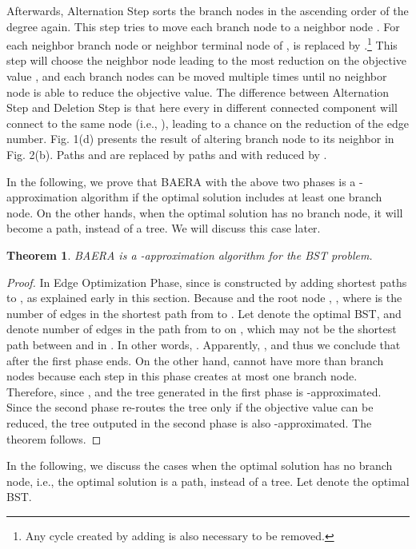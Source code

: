 \documentclass[conference]{IEEEtran}
\newtheorem{theorem}{Theorem}
\begin{document}
Afterwards, Alternation Step sorts the branch nodes in the ascending order
of the degree again. This step tries to move each branch node  to a
neighbor node . For each neighbor branch node or neighbor terminal
node  of ,  is replaced by .\footnote{Any cycle created by adding  is also necessary to be removed.}
This step will choose the neighbor node  leading to the most
reduction on the objective value , and each branch nodes can be
moved multiple times until no neighbor node is able to reduce the objective
value. The difference between Alternation Step and Deletion Step is that
here every  in different connected component will connect to the same
node (i.e., ), leading to a chance on the reduction of the edge
number. {Fig. 1(d) presents the result of altering branch node } to its
neighbor  in Fig. 2(b). Paths  and  are replaced by
paths  and  with  reduced by .

In the following, we prove that BAERA with the above two phases is a -approximation algorithm if the optimal solution includes at least one
branch node. On the other hands, when the optimal solution has no branch
node, it will become a path, instead of a tree.  We will discuss this case later.


\begin{theorem}
BAERA is a -approximation algorithm for the BST problem.
\label{thm:k_ratio}
\end{theorem}

\begin{proof}
In Edge Optimization Phase, since  is constructed by adding shortest
paths to ,  as explained early in this
section. Because 
and the root node , , where  is
the number of edges in the shortest path from  to . Let 
denote the optimal BST, and  denote number of edges in the
path from  to  on , which may not be the shortest path
between  and  in . In other words, .
Apparently, , and thus we conclude that  after the first phase ends. On the
other hand,  cannot have more than  branch nodes because each step in
this phase creates at most one branch node. Therefore,  since , and the tree  generated in the
first phase is -approximated. Since the second phase re-routes the tree
only if the objective value  can be reduced, the tree 
outputed in the second phase is also -approximated. The theorem follows.
\end{proof}



In the following, we discuss the cases when  the optimal solution has no branch node, i.e., the optimal solution is a path, instead of a tree. Let  denote the optimal BST.
\end{document}

